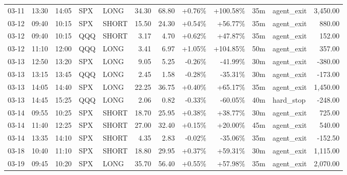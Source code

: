 \documentclass[11pt,a4paper,twoside]{article}
\begin{document}
\begin{center}
\begin{longtable}{>{\color{txtmain}}l l l l l r r r r r >{\color{txtmain}}l r}
03-11 & 13:30 & 14:05 & SPX & LONG & 34.30 & 68.80 & \textcolor{wingreen}{+0.76\%} & \textcolor{wingreen}{+100.58\%} & 35m & agent\_exit & \textcolor{wingreen}{3,450.00} \\
03-12 & 09:40 & 10:15 & SPX & SHORT & 15.50 & 24.30 & \textcolor{wingreen}{+0.54\%} & \textcolor{wingreen}{+56.77\%} & 35m & agent\_exit & \textcolor{wingreen}{880.00} \\
03-12 & 09:40 & 10:15 & QQQ & SHORT & 3.17 & 4.70 & \textcolor{wingreen}{+0.62\%} & \textcolor{wingreen}{+47.87\%} & 35m & agent\_exit & \textcolor{wingreen}{152.00} \\
03-12 & 11:10 & 12:00 & QQQ & LONG & 3.41 & 6.97 & \textcolor{wingreen}{+1.05\%} & \textcolor{wingreen}{+104.85\%} & 50m & agent\_exit & \textcolor{wingreen}{357.00} \\
03-13 & 12:50 & 13:20 & SPX & LONG & 9.05 & 5.25 & \textcolor{lossred}{-0.26\%} & \textcolor{lossred}{-41.99\%} & 30m & agent\_exit & \textcolor{lossred}{-380.00} \\
03-13 & 13:15 & 13:45 & QQQ & LONG & 2.45 & 1.58 & \textcolor{lossred}{-0.28\%} & \textcolor{lossred}{-35.31\%} & 30m & agent\_exit & \textcolor{lossred}{-173.00} \\
03-13 & 14:05 & 14:40 & SPX & LONG & 22.25 & 36.75 & \textcolor{wingreen}{+0.40\%} & \textcolor{wingreen}{+65.17\%} & 35m & agent\_exit & \textcolor{wingreen}{1,450.00} \\
03-13 & 14:45 & 15:25 & QQQ & LONG & 2.06 & 0.82 & \textcolor{lossred}{-0.33\%} & \textcolor{lossred}{-60.05\%} & 40m & hard\_stop & \textcolor{lossred}{-248.00} \\
03-14 & 09:55 & 10:25 & SPX & SHORT & 18.70 & 25.95 & \textcolor{wingreen}{+0.38\%} & \textcolor{wingreen}{+38.77\%} & 30m & agent\_exit & \textcolor{wingreen}{725.00} \\
03-14 & 11:40 & 12:25 & SPX & SHORT & 27.00 & 32.40 & \textcolor{wingreen}{+0.15\%} & \textcolor{wingreen}{+20.00\%} & 45m & agent\_exit & \textcolor{wingreen}{540.00} \\
03-14 & 13:35 & 14:10 & SPX & SHORT & 4.35 & 2.83 & \textcolor{lossred}{-0.02\%} & \textcolor{lossred}{-35.06\%} & 35m & agent\_exit & \textcolor{lossred}{-152.50} \\
03-18 & 10:40 & 11:10 & SPX & SHORT & 18.80 & 29.95 & \textcolor{wingreen}{+0.37\%} & \textcolor{wingreen}{+59.31\%} & 30m & agent\_exit & \textcolor{wingreen}{1,115.00} \\
03-19 & 09:45 & 10:20 & SPX & LONG & 35.70 & 56.40 & \textcolor{wingreen}{+0.55\%} & \textcolor{wingreen}{+57.98\%} & 35m & agent\_exit & \textcolor{wingreen}{2,070.00} \\

\end{longtable}
\end{center}
\end{document}
